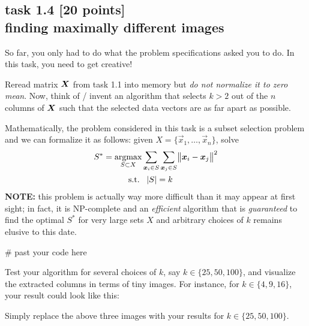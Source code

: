 
\subsection*{task 1.4 [20 points] \\[1ex] finding maximally different images}

So far, you only had to do what the problem specifications asked you to do. In this task, you need to get creative!

Reread matrix $\bm{X}$ from task 1.1 into memory but \emph{do not normalize it to zero mean}. Now, think of / invent an algorithm that selects $k>2$ out of the $n$ columns of $\bm{X}$ such that the selected data vectors are as far apart as possible. 

Mathematically, the problem considered in this task is a subset selection problem and we can formalize it as follows: given $X = \{ \vec{x}_1, \ldots, \vec{x}_n \}$, solve
\begin{align*}
S^* = \operatorname*{argmax}_{S \subset X} & \sum_{\bm{x}_i \in S} \sum_{\bm{x}_j \in S} \bigl \lVert \bm{x}_i - \bm{x}_j \bigr \rVert^2 \\
\operatorname{s.\!t.} \; & \; \; \lvert S \rvert = k
\end{align*}
\textbf{NOTE:} this problem is actually way more difficult than it may appear at first sight; in fact, it is NP-complete and an \textit{efficient} algorithm that is \textit{guaranteed} to find the optimal $S^*$ for very large sets $X$ and arbitrary choices of $k$ remains elusive to this date. \vspace{1ex}

\begin{python}
# past your code here


\end{python}
\vspace{2cm}

Test your algorithm for several choices of $k$, say $k \in \{ 25, 50, 100 \}$, and visualize the extracted columns in terms of tiny images. For instance, for $k \in \{ 4, 9, 16 \}$, your result could look like this:

Simply replace the above three images with your results for $k \in \{25, 50, 100\}$.






